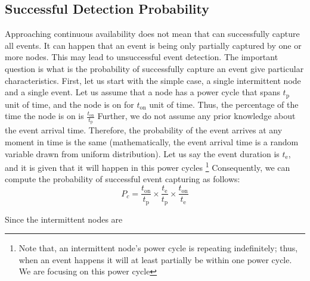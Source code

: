 \subsection{Successful Detection Probability}
%
Approaching continuous availability does not mean that \sys can successfully capture all events.
It can happen that an event is being only partially captured by one or more nodes. 
This may lead to unsuccessful event detection. The important question is what is the probability of successfully 
capture an event give particular \sys characteristics.  
%
First, let us start with the simple case, a single intermittent node and a single event. 
Let us assume that a node has a power cycle that spans $t_\text{p}$ unit of time, and the node is on for $t_\text{on}$ unit of time. 
Thus, the percentage of the time the node is on is $\frac{t_\text{on}}{t_\text{p}}$
Further, we do not assume any prior knowledge about the event arrival time.
Therefore, the probability of the event arrives at any moment in time is the same 
(mathematically, the event arrival time is a random variable drawn from uniform distribution).
Let us say the event duration is $t_\text{e}$, and it is given that it will happen in this power cycles
\footnote{Note that, an intermittent node's power cycle is repeating indefinitely; thus, when an event happens it will at least partially be within one  power cycle. We are focusing on this power cycle}
Consequently, we can compute the probability of successful event capturing as follows:
$$
P_c =  \frac{t_\text{on}}{t_\text{p}} \times \frac{t_\text{e}}{t_\text{p}} \times \frac{t_\text{on}}{t_\text{e}}
$$

Since the intermittent nodes are 






































